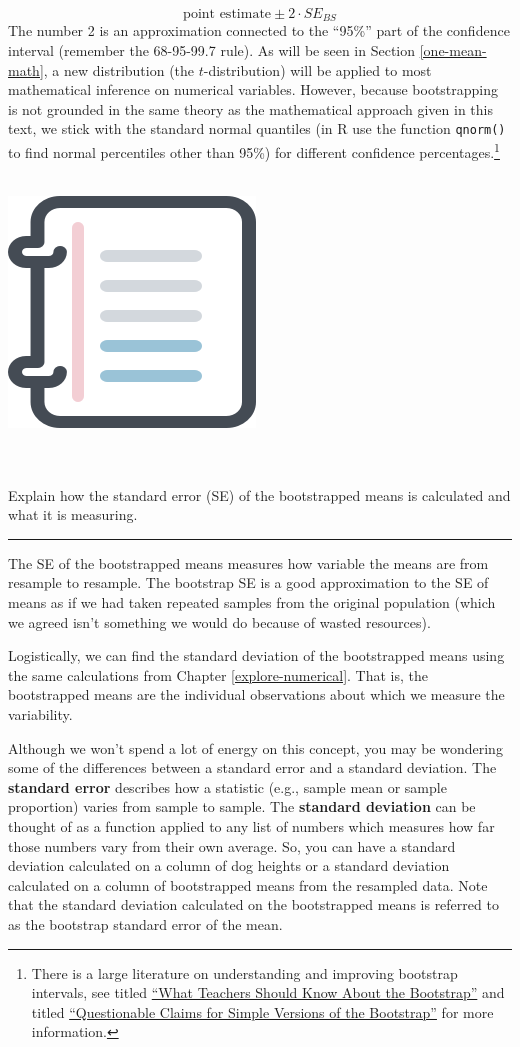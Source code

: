 \documentclass[
  10pt,
  openany]{book}
\newenvironment{mdframedwithfootGPWE}
{   
    \savenotes
    \begin{mdframed}[%
    topline=true, bottomline=true, linecolor=oiB, linewidth=0.5pt,
    rightline=false, leftline=false,
    backgroundcolor=oiLGray]
    \renewcommand{\thempfootnote}{\arabic{footnote}}
    }
{
    \end{mdframed}
    \spewnotes
}
\newenvironment{workedexample}{
    \let\oldrule\rule
    \renewcommand{\rule}[2]{\vspace{-2mm}\oldrule{##1}{##2}\vspace{-2mm}}
\vspace{4mm}
\begin{mdframedwithfootGPWE}
\begin{minipage}[t]{0.10\textwidth}
{$\:$ \\ \setkeys{Gin}{width=2.5em,keepaspectratio}\includegraphics{images/_icons/worked-example.png}}
\end{minipage}
\hfill
\begin{minipage}[t]{0.90\textwidth}
\vspace{-2mm}
\setlength{\parskip}{1em}
\noindent\textbf{\color{oiB}\small\fontfamily{phv}\selectfont{\MakeUppercase{Example}}} $\:$ \\ \\
}{\end{minipage}
\end{mdframedwithfootGPWE}
\vspace{4mm}
}
\begin{document}
\[\mbox{point estimate} \pm 2 \cdot SE_{BS}\] The number 2 is an approximation connected to the ``95\%'' part of the confidence interval (remember the 68-95-99.7 rule).
As will be seen in Section \ref{one-mean-math}, a new distribution (the \(t\)-distribution) will be applied to most mathematical inference on numerical variables.
However, because bootstrapping is not grounded in the same theory as the mathematical approach given in this text, we stick with the standard normal quantiles (in R use the function \texttt{qnorm()} to find normal percentiles other than 95\%) for different confidence percentages.\footnote{There is a large literature on understanding and improving bootstrap intervals, see \citet{Hesterbeg:2015} titled \href{https://www.tandfonline.com/doi/full/10.1080/00031305.2015.1089789}{``What Teachers Should Know About the Bootstrap''} and \citet{Hayden:2019} titled \href{https://www.tandfonline.com/doi/full/10.1080/10691898.2019.1669507}{``Questionable Claims for Simple Versions of the Bootstrap''} for more information.}

\begin{workedexample}
Explain how the standard error (SE) of the bootstrapped means is calculated and what it is measuring.

\begin{center}\rule{0.5\linewidth}{0.5pt}\end{center}

The SE of the bootstrapped means measures how variable the means are from resample to resample.
The bootstrap SE is a good approximation to the SE of means as if we had taken repeated samples from the original population (which we agreed isn't something we would do because of wasted resources).

Logistically, we can find the standard deviation of the bootstrapped means using the same calculations from Chapter \ref{explore-numerical}.
That is, the bootstrapped means are the individual observations about which we measure the variability.

\end{workedexample}

Although we won't spend a lot of energy on this concept, you may be wondering some of the differences between a standard error and a standard deviation.
The \textbf{standard error} describes how a statistic (e.g., sample mean or sample proportion) varies from sample to sample.
The \textbf{standard deviation} can be thought of as a function applied to any list of numbers which measures how far those numbers vary from their own average.
So, you can have a standard deviation calculated on a column of dog heights or a standard deviation calculated on a column of bootstrapped means from the resampled data.
Note that the standard deviation calculated on the bootstrapped means is referred to as the bootstrap standard error of the mean.
\end{document}
